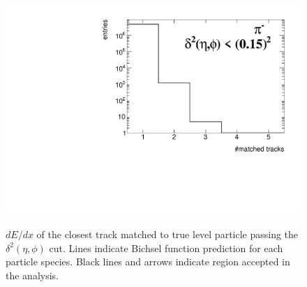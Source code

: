 \begin{figure}[h!]
{		\includegraphics[width=\linewidth,page=26]{graphics/eff/trackSplitting_QualityEtaPhiCD.pdf}\\
	}%
	\caption[$dE/dx$ of the closest track matched to true level particle passing the $\delta^{2}\left(\eta,\phi\right)$ cut.]{$dE/dx$ of the closest track matched to true level particle passing the $\delta^{2}\left(\eta,\phi\right)$ cut. Lines indicate Bichsel function prediction for each particle species. Black lines and arrows indicate region accepted in the analysis.}\label{fig:trackSplittingEtaPhidEdx}
\end{figure}

